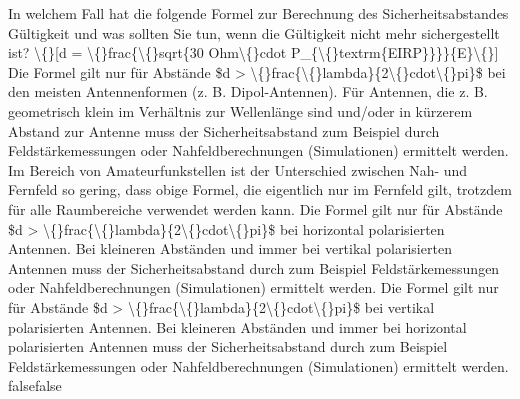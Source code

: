     {In welchem Fall hat die folgende Formel zur Berechnung des Sicherheitsabstandes Gültigkeit und was sollten Sie tun, wenn die Gültigkeit nicht mehr sichergestellt ist? \textbackslash\{\}[d = \textbackslash\{\}frac\{\textbackslash\{\}sqrt\{30 Ohm\textbackslash\{\}cdot P\_\{\textbackslash\{\}textrm\{EIRP\}\}\}\}\{E\}\textbackslash\{\}]}
    {Die Formel gilt nur für Abstände \$d > \textbackslash\{\}frac\{\textbackslash\{\}lambda\}\{2\textbackslash\{\}cdot\textbackslash\{\}pi\}\$ bei den meisten Antennenformen (z. B. Dipol-Antennen). Für Antennen, die z. B. geometrisch klein im Verhältnis zur Wellenlänge sind und/oder in kürzerem Abstand zur Antenne muss der Sicherheitsabstand zum Beispiel durch Feldstärkemessungen oder Nahfeldberechnungen (Simulationen) ermittelt werden.}
    {Im Bereich von Amateurfunkstellen ist der Unterschied zwischen Nah- und Fernfeld so gering, dass obige Formel, die eigentlich nur im Fernfeld gilt, trotzdem für alle Raumbereiche verwendet werden kann.}
    {Die Formel gilt nur für Abstände \$d > \textbackslash\{\}frac\{\textbackslash\{\}lambda\}\{2\textbackslash\{\}cdot\textbackslash\{\}pi\}\$ bei horizontal polarisierten Antennen.
Bei kleineren Abständen und immer bei vertikal polarisierten Antennen muss der Sicherheitsabstand durch zum Beispiel Feldstärkemessungen oder Nahfeldberechnungen (Simulationen) ermittelt werden.}
    {Die Formel gilt nur für Abstände \$d > \textbackslash\{\}frac\{\textbackslash\{\}lambda\}\{2\textbackslash\{\}cdot\textbackslash\{\}pi\}\$ bei vertikal polarisierten Antennen.
Bei kleineren Abständen und immer bei horizontal polarisierten Antennen muss der Sicherheitsabstand durch zum Beispiel Feldstärkemessungen oder Nahfeldberechnungen (Simulationen) ermittelt werden.}
    {false}{false}